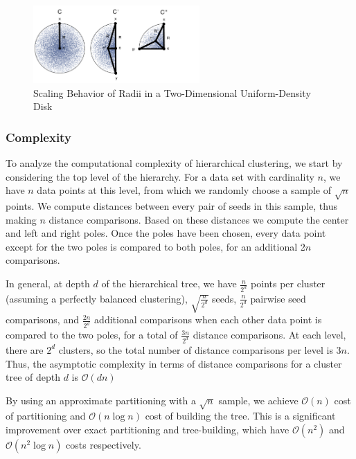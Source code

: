 \begin{figure}[ht!]
    \centering
    \includegraphics[width=2.5in]{images/geometry/geometry.pdf}
    \caption{Scaling Behavior of Radii in a Two-Dimensional Uniform-Density Disk}
    \label{fig:methods:scaling_behavior}
\end{figure}

\subsubsection {Complexity}
\label{subsubsec:methods:clustering:complexity}

To analyze the computational complexity of hierarchical
clustering, we start by considering the top level of the hierarchy. 
For a data set with cardinality $n$, we have $n$ data points at this 
level, from which we randomly choose a sample of $\sqrt{n}$ points. 
We compute distances between every pair of seeds in this sample, 
thus making $n$ distance comparisons. Based on these distances 
we compute the center and left and right poles. Once the poles 
have been chosen, every data point except for the two poles is 
compared to both poles, for an additional 2$n$ comparisons. 


In general, at depth $d$ of
the hierarchical tree, we have $\frac{n}{2^d}$ points per cluster (assuming a
perfectly balanced clustering), $\sqrt{\frac{n}{2^d}}$ seeds, $\frac{n}{2^d}$
pairwise seed comparisons, and $\frac{2n}{2^{d}}$ additional comparisons when 
each other data point is compared to the two poles, for a total of $\frac{3n}{2^d}$
distance comparisons. At each level, there are $2^d$ clusters,
so the total number of distance comparisons per level is
3$n$. Thus, the asymptotic complexity in terms of distance
comparisons for a cluster tree of depth $d$ is $\mathcal{O}(dn)$

By using an approximate partitioning with a $\sqrt{n}$ sample, we achieve $\mathcal{O}(n)$ cost of 
partitioning and $\mathcal{O}(n \log n)$ cost of building the tree. This is a significant improvement over 
exact partitioning and tree-building, which have $\mathcal{O}(n^2)$ and $\mathcal{O}(n^2 \log n)$ costs respectively.


